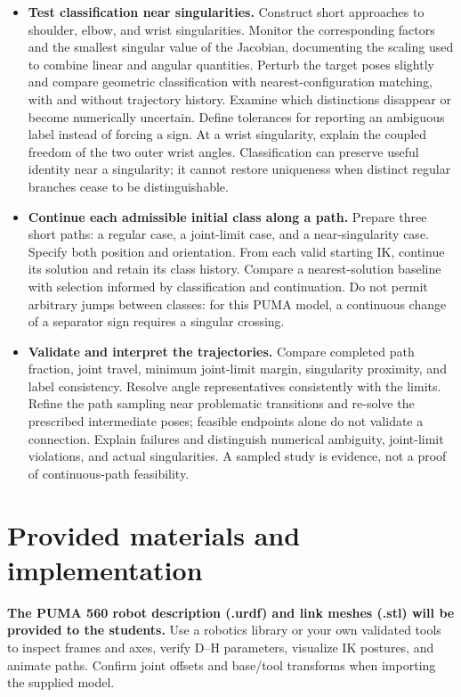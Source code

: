 \documentclass[11pt,a4paper]{article}
\begin{document}
\begin{itemize}
  \item \textbf{Test classification near singularities.}
  Construct short approaches to shoulder, elbow, and wrist singularities.
  Monitor the corresponding factors and the smallest singular value of the
  Jacobian, documenting the scaling used to combine linear and angular quantities.
  Perturb the target poses slightly and compare geometric classification with
  nearest-configuration matching, with and without trajectory history. Examine
  which distinctions disappear or become numerically uncertain. Define tolerances
  for reporting an ambiguous label instead of forcing a sign. At a wrist
  singularity, explain the coupled freedom of the two outer wrist angles.
  Classification can preserve useful identity near a singularity; it cannot
  restore uniqueness when distinct regular branches cease to be distinguishable.

  \item \textbf{Continue each admissible initial class along a path.}
  Prepare three short paths: a regular case, a joint-limit case, and a
  near-singularity case. Specify both position and orientation. From each valid
  starting IK, continue its solution and retain its class history. Compare a
  nearest-solution baseline with selection informed by classification and
  continuation. Do not permit arbitrary jumps between classes: for this PUMA
  model, a continuous change of a separator sign requires a singular crossing.

  \item \textbf{Validate and interpret the trajectories.}
  Compare completed path fraction, joint travel, minimum joint-limit margin,
  singularity proximity, and label consistency. Resolve angle representatives
  consistently with the limits. Refine the path sampling near problematic
  transitions and re-solve the prescribed intermediate poses; feasible endpoints
  alone do not validate a connection. Explain failures and distinguish numerical
  ambiguity, joint-limit violations, and actual singularities. A sampled study
  is evidence, not a proof of continuous-path feasibility.
\end{itemize}

\section*{Provided materials and implementation}
\textbf{The PUMA 560 robot description (.urdf) and link meshes (.stl) will be
provided to the students.}
Use a robotics library or your own validated tools to inspect frames and axes,
verify D--H parameters, visualize IK postures, and animate paths. Confirm joint
offsets and base/tool transforms when importing the supplied model.
\end{document}
